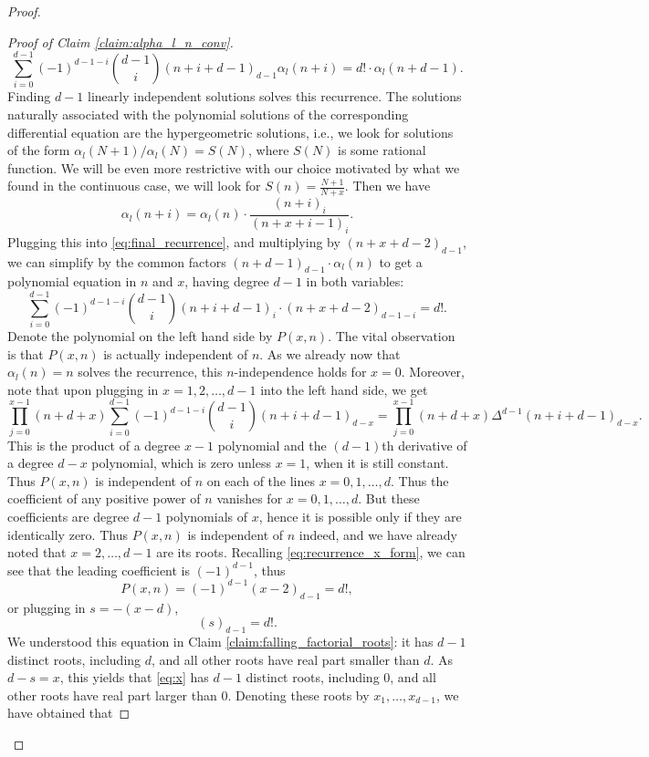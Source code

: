 \documentclass[10pt,a4paper]{amsart}
\begin{document}
\begin{proof}
\begin{proof}[Proof of Claim \ref{claim:alpha_l_n_conv}]
\begin{equation}
    \sum_{i=0}^{d-1}(-1)^{d-1-i} \binom{d-1}{i}(n+i+d-1)_{d-1}\alpha_l(n+i)=d!\cdot\alpha_l(n+d-1).
    \end{equation}
    Finding $d-1$ linearly independent solutions solves this recurrence. The solutions naturally associated with the polynomial solutions of the corresponding differential equation are the hypergeometric solutions, i.e., we look for solutions of the form $\alpha_l(N+1)/\alpha_l(N)=S(N)$, where $S(N)$ is some rational function. We will be even more restrictive with our choice motivated by what we found in the continuous case, we will look for $S(n)=\frac{N+1}{N+x}$. 
    Then we have 
    $$\alpha_l(n+i)=\alpha_l(n)\cdot \frac{(n+i)_i}{(n+x+i-1)_i}.$$
    Plugging this into \eqref{eq:final_recurrence}, and multiplying by $(n+x+d-2)_{d-1}$, we can simplify by the common factors $(n+d-1)_{d-1}\cdot \alpha_l(n)$ to get a polynomial equation in $n$ and $x$, having degree $d-1$ in both variables:
    \begin{equation}\label{eq:recurrence_x_form}
    \sum_{i=0}^{d-1}(-1)^{d-1-i} \binom{d-1}{i}(n+i+d-1)_{i}\cdot (n+x+d-2)_{d-1-i}=d!.
    \end{equation}    
    Denote the polynomial on the left hand side by $P(x, n)$. The vital observation is that $P(x, n)$ is actually independent of $n$. As we already now that $\alpha_l(n)=n$ solves the recurrence, this $n$-independence holds for $x=0$. Moreover, note that upon plugging in $x=1,2 , \dots, d-1$ into the left hand side, we get
    $$\prod_{j=0}^{x-1}(n+d+x)\sum_{i=0}^{d-1}(-1)^{d-1-i}\binom{d-1}{i}(n+i+d-1)_{d-x}=\prod_{j=0}^{x-1}(n+d+x) \Delta^{d-1}(n+i+d-1)_{d-x}.$$
    This is the product of a degree $x-1$ polynomial and the $(d-1)$th derivative of a degree $d-x$ polynomial, which is zero unless $x=1$, when it is still constant. Thus $P(x, n)$ is independent of $n$ on each of the lines $x=0, 1, \dots, d$. Thus the coefficient of any positive power of $n$ vanishes for $x=0, 1, \dots, d$. But these coefficients are degree $d-1$ polynomials of $x$, hence it is possible only if they are identically zero. Thus $P(x, n)$ is independent of $n$ indeed, and we have already noted that $x=2, \dots, d-1$ are its roots. Recalling \eqref{eq:recurrence_x_form}, we can see that the leading coefficient is $(-1)^{d-1}$, thus 
    \begin{equation}\label{eq:x}
    P(x, n)=(-1)^{d-1}(x-2)_{d-1}=d!,
    \end{equation}
    or plugging in $s=-(x-d)$,
    $$(s)_{d-1}=d!.$$
    We understood this equation in Claim \ref{claim:falling_factorial_roots}: it has $d-1$ distinct roots, including $d$, and all other roots have real part smaller than $d$. As $d-s=x$, this yields that \eqref{eq:x} has $d-1$ distinct roots, including 0, and all other roots have real part larger than 0. Denoting these roots by $x_1, \dots, x_{d-1}$, we have obtained that

\end{proof}
\end{proof}
\end{document}
